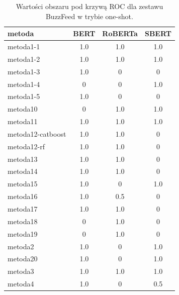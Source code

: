 \begin{table}[H]
	\centering
	\caption{Wartości obszaru pod krzywą ROC dla zestawu BuzzFeed w trybie one-shot.}
	\label{tab:roc_auc_one_shot}
	\small
	\begin{tabular}{lccc}
		\toprule
		\textbf{metoda}   & \textbf{BERT} & \textbf{RoBERTa} & \textbf{SBERT} \\
		\midrule
		metoda1-1         & 1.0           & 1.0              & 1.0            \\
		metoda1-2         & 1.0           & 1.0              & 1.0            \\
		metoda1-3         & 1.0           &   0              &   0            \\
		metoda1-4         &   0           &   0              & 1.0            \\
		metoda1-5         & 1.0           &   0              &   0            \\
		metoda10          &   0           & 1.0              & 1.0            \\
		metoda11          & 1.0           & 1.0              & 1.0            \\
		metoda12-catboost & 1.0           & 1.0              &   0            \\
		metoda12-rf       & 1.0           & 1.0              &   0            \\
		metoda13          & 1.0           & 1.0              &   0            \\
		metoda14          & 1.0           & 1.0              &   0            \\
		metoda15          & 1.0           &   0              & 1.0            \\
		metoda16          & 1.0           & 0.5              &   0            \\
		metoda17          & 1.0           & 1.0              &   0            \\
		metoda18          &   0           & 1.0              &   0            \\
		metoda19          &   0           & 1.0              &   0            \\
		metoda2           & 1.0           &   0              & 1.0            \\
		metoda20          & 1.0           &   0              & 1.0            \\
		metoda3           & 1.0           & 1.0              & 1.0            \\
		metoda4           & 1.0           &   0              & 0.5            \\

\end{tabular}
\end{table}
